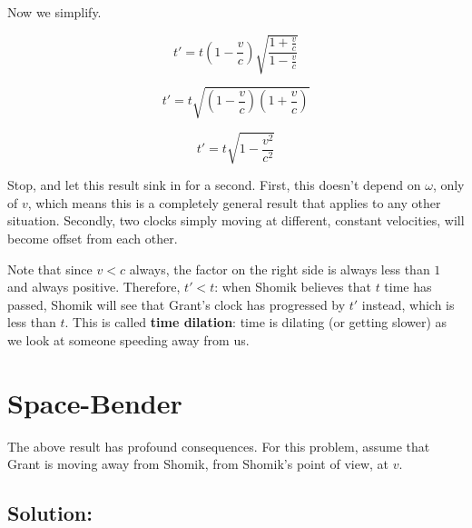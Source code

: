 \documentclass{article}
\begin{document}
\begin{enumerate}[label=(\alph*)]
    Now we simplify.

    $$t' = t \left(1 - \frac{v}{c} \right) \sqrt{\frac{1 + \frac{v}{c}}{1 - \frac{v}{c}}}$$

    $$t' = t \sqrt{\left(1 - \frac{v}{c}\right) \left(1 + \frac{v}{c} \right)}$$

    $$\boxed{t' = t\sqrt{1 - \frac{v^2}{c^2}}}$$

    Stop, and let this result sink in for a second. First, this doesn't depend on $\omega$, only of $v$, which means this is a completely general result that applies to any other situation. Secondly, two clocks simply moving at different, constant velocities, will become offset from each other.

    Note that since $v < c$ always, the factor on the right side is always less than $1$ and always positive. Therefore, $t' < t$: when Shomik believes that $t$ time has passed, Shomik will see that Grant's clock has progressed by $t'$ instead, which is less than $t$. This is called \textbf{time dilation}: time is dilating (or getting slower) as we look at someone speeding away from us.
\end{enumerate}

\newpage

\section{Space-Bender}

The above result has profound consequences. For this problem, assume that Grant is moving away from Shomik, from Shomik's point of view, at $v$.

\subsection{Solution:}
\end{document}
